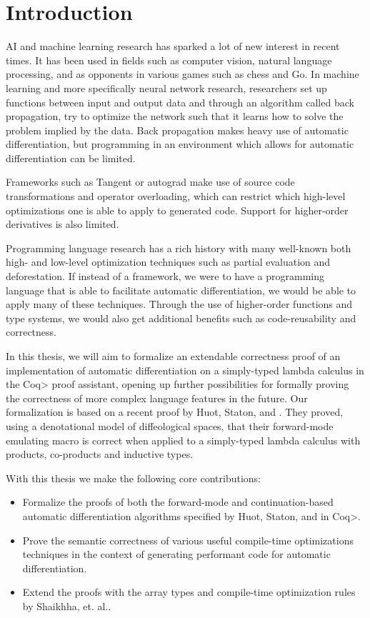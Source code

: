 \section{Introduction}
AI and machine learning research has sparked a lot of new interest in recent times. It has been used in fields such as computer vision, natural language processing, and as opponents in various games such as chess and Go.
In machine learning and more specifically neural network research, researchers set up functions between input and output data and through an algorithm called back propagation, try to optimize the network such that it learns how to solve the problem implied by the data.
Back propagation makes heavy use of automatic differentiation, but programming in an environment which allows for automatic differentiation can be limited.

Frameworks such as Tangent or autograd make use of source code transformations and operator overloading, which can restrict which high-level optimizations one is able to apply to generated code. Support for higher-order derivatives is also limited.

Programming language research has a rich history with many well-known both high- and low-level optimization techniques such as partial evaluation and deforestation.
If instead of a framework, we were to have a programming language that is able to facilitate automatic differentiation, we would be able to apply many of these techniques. Through the use of higher-order functions and type systems, we would also get additional benefits such as code-reusability and correctness.

In this thesis, we will aim to formalize an extendable correctness proof of an implementation of automatic differentiation on a simply-typed lambda calculus in the \<Coq> proof assistant, opening up further possibilities for formally proving the correctness of more complex language features in the future.
Our formalization is based on a recent proof by Huot, Staton, and \Vakar{} \cite{huot2020correctness}.
They proved, using a denotational model of diffeological spaces, that their forward-mode emulating macro is correct when applied to a simply-typed lambda calculus with products, co-products and inductive types.

With this thesis we make the following core contributions:
\begin{itemize}
  \item Formalize the proofs of both the forward-mode and continuation-based automatic differentiation algorithms specified by Huot, Staton, and \Vakar{} \cite{huot2020correctness} in \<Coq>.
  \item Prove the semantic correctness of various useful compile-time optimizations techniques in the context of generating performant code for automatic differentiation.
  \item Extend the proofs with the array types and compile-time optimization rules by Shaikhha, et. al.\cite{Shaikha2019}.
\end{itemize}

